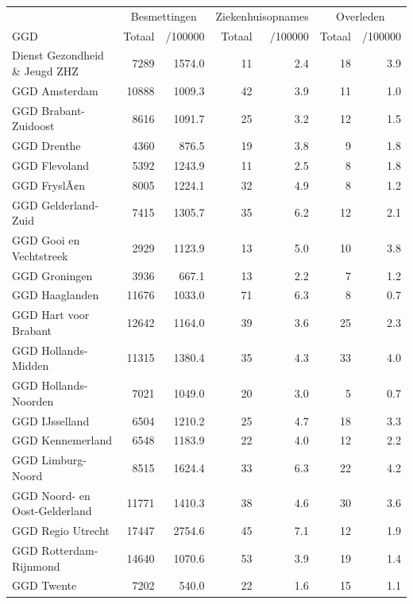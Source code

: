 \documentclass[
  english,
  man,floatsintext]{apa6}
\begin{document}
\begin{table}
\centering\begingroup\fontsize{10}{12}\selectfont

\begin{threeparttable}
\begin{tabular}{lrrrrrr}
\toprule
\multicolumn{1}{c}{ } & \multicolumn{2}{c}{Besmettingen} & \multicolumn{2}{c}{Ziekenhuisopnames} & \multicolumn{2}{c}{Overleden} \\
\cmidrule(l{3pt}r{3pt}){2-3} \cmidrule(l{3pt}r{3pt}){4-5} \cmidrule(l{3pt}r{3pt}){6-7}
GGD & Totaal & /100000 & Totaal & /100000 & Totaal & /100000\\
\midrule
Dienst Gezondheid \& Jeugd ZHZ & 7289 & 1574.0 & 11 & 2.4 & 18 & 3.9\\
GGD Amsterdam & 10888 & 1009.3 & 42 & 3.9 & 11 & 1.0\\
GGD Brabant-Zuidoost & 8616 & 1091.7 & 25 & 3.2 & 12 & 1.5\\
GGD Drenthe & 4360 & 876.5 & 19 & 3.8 & 9 & 1.8\\
GGD Flevoland & 5392 & 1243.9 & 11 & 2.5 & 8 & 1.8\\
GGD FryslÃ¢n & 8005 & 1224.1 & 32 & 4.9 & 8 & 1.2\\
GGD Gelderland-Zuid & 7415 & 1305.7 & 35 & 6.2 & 12 & 2.1\\
GGD Gooi en Vechtstreek & 2929 & 1123.9 & 13 & 5.0 & 10 & 3.8\\
GGD Groningen & 3936 & 667.1 & 13 & 2.2 & 7 & 1.2\\
GGD Haaglanden & 11676 & 1033.0 & 71 & 6.3 & 8 & 0.7\\
GGD Hart voor Brabant & 12642 & 1164.0 & 39 & 3.6 & 25 & 2.3\\
GGD Hollands-Midden & 11315 & 1380.4 & 35 & 4.3 & 33 & 4.0\\
GGD Hollands-Noorden & 7021 & 1049.0 & 20 & 3.0 & 5 & 0.7\\
GGD IJsselland & 6504 & 1210.2 & 25 & 4.7 & 18 & 3.3\\
GGD Kennemerland & 6548 & 1183.9 & 22 & 4.0 & 12 & 2.2\\
GGD Limburg-Noord & 8515 & 1624.4 & 33 & 6.3 & 22 & 4.2\\
GGD Noord- en Oost-Gelderland & 11771 & 1410.3 & 38 & 4.6 & 30 & 3.6\\
GGD Regio Utrecht & 17447 & 2754.6 & 45 & 7.1 & 12 & 1.9\\
GGD Rotterdam-Rijnmond & 14640 & 1070.6 & 53 & 3.9 & 19 & 1.4\\
GGD Twente & 7202 & 540.0 & 22 & 1.6 & 15 & 1.1\\

\end{tabular}
\end{threeparttable}
\end{table}
\end{document}

